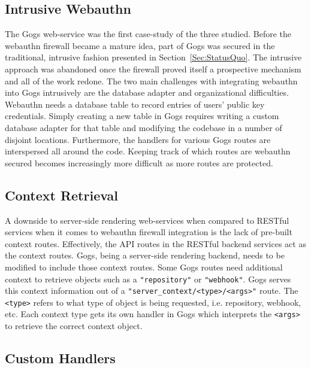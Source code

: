 \subsection{Intrusive Webauthn}

The Gogs web-service was the first case-study of the three studied. Before the webauthn firewall became a mature idea, part of Gogs was secured in the traditional, intrusive fashion presented in Section~\ref{Sec:StatusQuo}. The intrusive approach was abandoned once the firewall proved itself a prospective mechanism and all of the work redone. The two main challenges with integrating webauthn into Gogs intrusively are the database adapter and organizational difficulties. Webauthn needs a database table to record entries of users' public key credentials. Simply creating a new table in Gogs requires writing a custom database adapter for that table and modifying the codebase in a number of disjoint locations. Furthermore, the handlers for various Gogs routes are interspersed all around the code. Keeping track of which routes are webauthn secured becomes increasingly more difficult as more routes are protected.

\subsection{Context Retrieval}

A downside to server-side rendering web-services when compared to RESTful services when it comes to webauthn firewall integration is the lack of pre-built context routes. Effectively, the API routes in the RESTful backend services act as the context routes. Gogs, being a server-side rendering backend, needs to be modified to include those context routes. Some Gogs routes need additional context to retrieve objects such as a \lstinline{"repository"} or \lstinline{"webhook"}. Gogs serves this context information out of a \lstinline{"server_context/<type>/<args>"} route. The \lstinline{<type>} refers to what type of object is being requested, i.e. repository, webhook, etc. Each context type gets its own handler in Gogs which interprets the \lstinline{<args>} to retrieve the correct context object.


\subsection{Custom Handlers}


